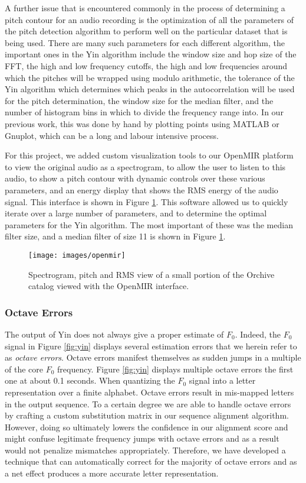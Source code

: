 A further issue that is encountered commonly in the process of
determining a pitch contour for an audio recording is the optimization
of all the parameters of the pitch detection algorithm to perform well
on the particular dataset that is being used.  There are many such
parameters for each different algorithm, the important ones in the Yin
algorithm include the window size and hop size of the FFT, the high
and low frequency cutoffs, the high and low frequencies around which
the pitches will be wrapped using modulo arithmetic, the tolerance of
the Yin algorithm which determines which peaks in the autocorrelation
will be used for the pitch determination, the window size for the
median filter, and the number of histogram bins in which to divide the
frequency range into.  In our previous work, this was done by hand by
plotting points using MATLAB or Gnuplot, which can be a long and
labour intensive process.

For this project, we added custom visualization tools to our OpenMIR
platform to view the original audio as a spectrogram, to allow the
user to listen to this audio, to show a pitch contour with dynamic
controls over these various parameters, and an energy display that
shows the RMS energy of the audio signal.  This interface is shown in
Figure \ref{fig:openmir}.  This software allowed us to quickly
iterate over a large number of parameters, and to determine the
optimal parameters for the Yin algorithm.  The most important of these
was the median filter size, and a median filter of size 11 is shown in
Figure \ref{fig:openmir}.

\begin{figure}[t]
\centering
\texttt{[image: images/openmir]}
\caption{Spectrogram, pitch and RMS view of a small portion of the Orchive
catalog viewed with the OpenMIR interface. }
\label{fig:openmir}
\end{figure}

\subsubsection{Octave Errors}
The output of Yin does not always give a proper estimate of $F_0$.
Indeed, the $F_0$ signal in Figure \ref{fig:yin} displays several
estimation errors that we herein refer to as \emph{octave errors}.
Octave errors manifest themselves as sudden jumps in a multiple of the
core $F_0$ frequency. Figure \ref{fig:yin} displays multiple octave
errors the first one at about 0.1 seconds. When quantizing the $F_0$
signal into a letter representation over a finite alphabet. Octave
errors result in mis-mapped letters in the output sequence. To a
certain degree we are able to handle octave errors by crafting a
custom substitution matrix in our sequence alignment
algorithm. However, doing so ultimately lowers the confidence in our
alignment score and might confuse legitimate frequency jumps with
octave errors and as a result would not penalize mismatches
appropriately. Therefore, we have developed a technique that can
automatically correct for the majority of octave errors and as a net
effect produces a more accurate letter representation.

